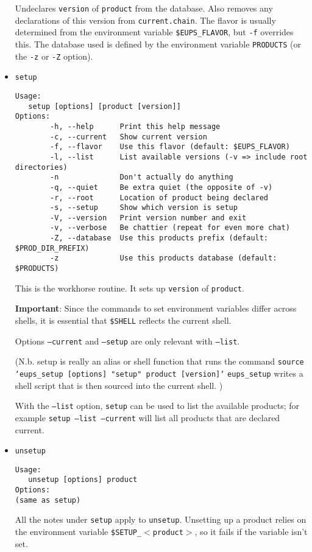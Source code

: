 \documentclass{article}
\begin{document}
\begin{itemize}
Undeclares \texttt{version} of \texttt{product} from the
database. Also removes any declarations of this version from
\texttt{current.chain}. The flavor is usually determined from the
environment variable \texttt{\$EUPS\_FLAVOR}, but \texttt{-f}
overrides this. The database used is defined by the environment
variable \texttt{PRODUCTS} (or the \texttt{-z} or \texttt{-Z} option).


\item \texttt{setup}
\begin{verbatim}
Usage:
   setup [options] [product [version]]
Options:
        -h, --help      Print this help message
        -c, --current   Show current version
        -f, --flavor    Use this flavor (default: $EUPS_FLAVOR)
        -l, --list      List available versions (-v => include root directories)
        -n              Don't actually do anything
        -q, --quiet     Be extra quiet (the opposite of -v)
        -r, --root      Location of product being declared
        -s, --setup     Show which version is setup
        -V, --version   Print version number and exit
        -v, --verbose   Be chattier (repeat for even more chat)
        -Z, --database  Use this products prefix (default: $PROD_DIR_PREFIX)
        -z              Use this products database (default: $PRODUCTS)
\end{verbatim}

This is the workhorse routine. It sets up \texttt{version} of \texttt{product}.

\textbf{Important}: Since the commands to set environment variables differ across shells,
it is essential that \texttt{\$SHELL} reflects the current shell.

Options \texttt{--current} and \texttt{--setup} are only relevant with \texttt{--list}.

(N.b. setup is really an alias or shell function that runs the command\hfil\break
\texttt{source `eups\_setup [options] "setup" product [version]`}\hfil\break
\texttt{eups\_setup} writes a shell script that is then sourced into the
current shell.
)

With the \texttt{--list} option, \texttt{setup} can be used to list the available
products; for example \texttt{setup --list --current} will list all products that
are declared current.


\item \texttt{unsetup}
\begin{verbatim}
Usage:
   unsetup [options] product
Options:
(same as setup)
\end{verbatim}
  
All the notes under \texttt{setup} apply to
\texttt{unsetup}. Unsetting up a product relies on the environment
variable \texttt{\$SETUP\_$<$product$>$}, so it fails if the variable
isn't set.

\end{itemize}
\end{document}
